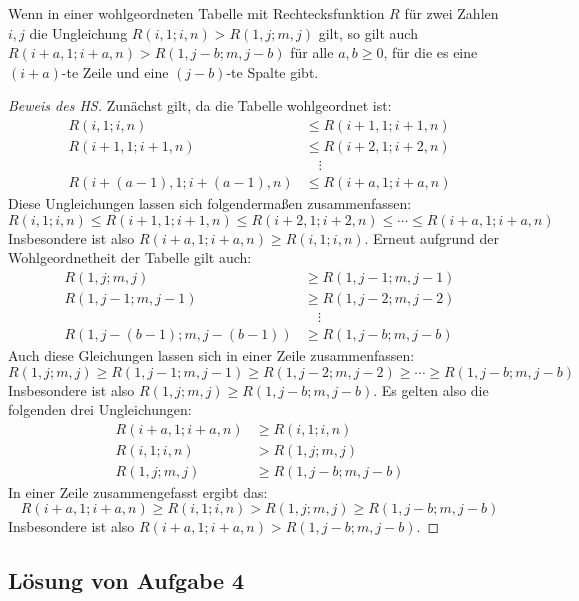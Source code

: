 \begin{lem}\label{mehr_nuller}
    Wenn in einer wohlgeordneten Tabelle mit Rechtecksfunktion $R$ für zwei Zahlen $i, j$ die Ungleichung 
    $R(i, 1; i, n)>R(1, j; m, j)$ gilt, so gilt auch $R(i+a, 1; i+a, n)>R(1, j-b; m, j-b)$ für alle $a, b\geq0$, für 
    die es eine $(i+a)$-te Zeile und eine $(j-b)$-te Spalte gibt.
\end{lem}
\begin{proof}[Beweis des HS]
    Zunächst gilt, da die Tabelle wohlgeordnet ist:
    \begin{align*}
        R(i, 1; i, n)&\leq R(i+1, 1; i+1, n)\\
        R(i+1, 1; i+1, n)&\leq R(i+2, 1; i+2, n)\\
        &\quad\vdots\\
        R(i+(a-1), 1; i+(a-1), n)&\leq R(i+a, 1; i+a, n)
    \end{align*}
    Diese Ungleichungen lassen sich folgendermaßen zusammenfassen:
    \[
        R(i, 1; i, n)\leq R(i+1, 1; i+1, n)\leq R(i+2, 1; i+2, n)\leq\cdots\leq R(i+a, 1; i+a, n)
    \]
    Insbesondere ist also $R(i+a, 1; i+a, n)\geq R(i, 1; i, n)$. Erneut aufgrund der Wohlgeordnetheit der Tabelle 
    gilt auch:
    \begin{align*}
        R(1, j; m, j)&\geq R(1, j-1; m, j-1)\\
        R(1, j-1; m, j-1)&\geq R(1, j-2; m, j-2)\\
        &\quad\vdots\\
        R(1, j-(b-1); m, j-(b-1))&\geq R(1, j-b; m, j-b)
    \end{align*}
    Auch diese Gleichungen lassen sich in einer Zeile zusammenfassen:
    \[
        R(1, j; m, j)\geq R(1, j-1; m, j-1)\geq R(1, j-2; m, j-2)\geq\cdots\geq R(1, j-b; m, j-b)
    \]
    Insbesondere ist also $R(1, j; m, j)\geq R(1, j-b; m, j-b)$. Es gelten also die folgenden drei Ungleichungen:
    \begin{align*}
        R(i+a, 1; i+a, n)&\geq R(i, 1; i, n)\\
        R(i, 1; i, n)&>R(1, j; m, j)\\
        R(1, j; m, j)&\geq R(1, j-b; m, j-b)
    \end{align*}
    In einer Zeile zusammengefasst ergibt das:
    \[
        R(i+a, 1; i+a, n)\geq R(i, 1; i, n)>R(1, j; m, j)\geq R(1, j-b; m, j-b)
    \]
    Insbesondere ist also $R(i+a, 1; i+a, n)>R(1, j-b; m, j-b)$.
\end{proof}

\subsection*{Lösung von Aufgabe 4}

